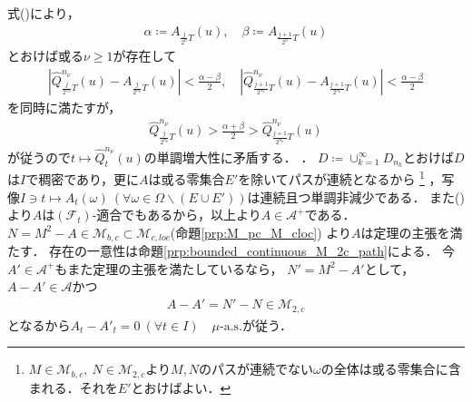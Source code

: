 \begin{prf}
\begin{description}
{					式()により，
					\begin{align}
						\alpha \coloneqq A_{\frac{j}{2^n}T}(u),
						\quad \beta \coloneqq A_{\frac{j+1}{2^n}T}(u)
					\end{align}
					とおけば或る$\nu \geq 1$が存在して
					\begin{align}
						\left| \hat{Q}_{\frac{j}{2^{n_k}}T}^{n_\nu}(u) - A_{\frac{j}{2^{n_k}}T}(u) \right| < \frac{\alpha - \beta}{2},
						\quad \left| \hat{Q}_{\frac{j+1}{2^{n_k}}T}^{n_\nu}(u) - A_{\frac{j+1}{2^{n_k}}T}(u) \right| < \frac{\alpha - \beta}{2}
					\end{align}
					を同時に満たすが，
					\begin{align}
						\hat{Q}_{\frac{j}{2^{n_k}}T}^{n_\nu}(u) > \frac{\alpha + \beta}{2} > \hat{Q}_{\frac{j+1}{2^{n_k}}T}^{n_\nu}(u)
					\end{align}
					が従うので$t \longmapsto \hat{Q}_t^{n_\nu}(u)$の単調増大性に矛盾する．
				}．
				$D \coloneqq \cup_{k=1}^{\infty} D_{n_k}$とおけば$D$は$I$で稠密であり，更に$A$は或る零集合$E'$を除いてパスが連続となるから
				\footnote{
					$M \in \mathcal{M}_{b,c},\ N \in \mathcal{M}_{2,c}$より$M,N$のパスが連続でない$\omega$の全体は或る零集合に含まれる．それを$E'$とおけばよい．
				}
				，写像$I \ni t \longmapsto A_t(\omega)\ (\forall \omega \in \Omega \backslash (E \cup E'))$は連続且つ単調非減少である．
				また()より$A$は$(\mathcal{F}_t)$-適合でもあるから，以上より$A \in \mathcal{A}^+$である．
				$N = M^2 - A \in \mathcal{M}_{b,c} \subset \mathcal{M}_{c,loc}$(命題\ref{prp:M_pc_M_cloc})
				より$A$は定理の主張を満たす．
				存在の一意性は命題\ref{prp:bounded_continuous_M_2c_path}による．
				今$A' \in \mathcal{A}^+$もまた定理の主張を満たしているなら，
				$N' = M^2 - A'$として，$A - A' \in \mathcal{A}$かつ
				\begin{align}
					A - A' = N' - N \in \mathcal{M}_{2,c}
				\end{align}
				となるから$A_t - A'_t = 0\ (\forall t \in I)\quad \mbox{$\mu$-a.s.}$が従う．
				

\end{description}
\end{prf}
